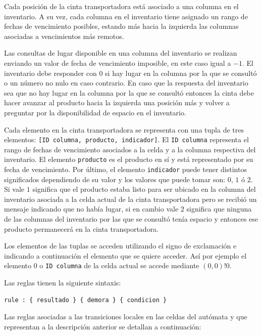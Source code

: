 \documentclass[10pt]{article}
\begin{document}
Cada posición de la cinta transportadora está asociado a una columna en el inventario. A su vez, cada columna en el inventario tiene asignado un rango de fechas de vencimiento posibles, estando más hacia la izquierda las columnas asociadas a vencimientos más remotos.

Las consultas de lugar disponible en una columna del inventario se realizan enviando un valor de fecha de vencimiento imposible, en este caso igual a $-1$. El inventario debe responder con $0$ si hay lugar en la columna por la que se consultó o un número no nulo en caso contrario. En caso que la respuesta del inventario sea que no hay lugar en la columna por la que se consultó entonces la cinta debe hacer avanzar al producto hacia la izquierda una posición más y volver a preguntar por la disponibilidad de espacio en el inventario.

Cada elemento en la cinta transportadora se representa con una tupla de tres elementos: \texttt{[ID columna, producto, indicador]}. El \texttt{ID columna} representa el rango de fechas de vencimiento asociados a la celda y a la columna respectiva del inventario. El elemento \texttt{producto} es el producto en sí y está representado por su fecha de vencimiento. Por último, el elemento \texttt{indicador} puede tener distintos significados dependiendo de su valor y los valores que puede tomar son: $0$, $1$ ó $2$. Si vale $1$ significa que el producto estaba listo para ser ubicado en la columna del inventario asociada a la celda actual de la cinta transportadora pero se recibió un mensaje indicando que no había lugar, si en cambio vale $2$ significa que ninguna de las columnas del inventario por las que se consultó tenía espacio y entonces ese producto permanecerá en la cinta transportadora.

Los elementos de las tuplas se acceden utilizando el signo de exclamación e indicando a continuación el elemento que se quiere acceder. Así por ejemplo el elemento $0$ o \texttt{ID columna} de la celda actual se accede mediante $(0,0)!0$.

Las reglas tienen la siguiente sintaxis: 
\begin{lstlisting}
rule : { resultado } { demora } { condicion }
\end{lstlisting}

Las reglas asociadas a las transiciones locales en las celdas del autómata y que representan a la descripción anterior se detallan a continuación:
\end{document}
